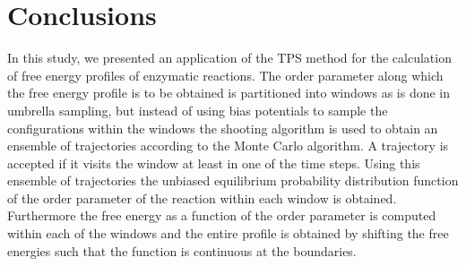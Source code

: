 \documentclass[journal=jpcbfk,manuscript=article,layout=traditional]{achemso}
\begin{document}
\section{Conclusions}
In this study, we presented an application of the TPS method for the calculation 
of free energy profiles of enzymatic reactions. The order parameter along which the 
free energy profile is to be obtained is partitioned into windows as is done in 
umbrella sampling, but instead of using bias potentials to sample the configurations
within the windows the shooting algorithm is used to
obtain an ensemble of trajectories according to the Monte Carlo algorithm. A 
trajectory is accepted if it visits the window at least in one of the time steps. 
Using this ensemble of trajectories the unbiased equilibrium probability distribution 
function of the order parameter of the reaction within each window is obtained.
Furthermore the free energy as a function of the order parameter is computed within 
each of the windows and the entire profile is obtained by shifting the free energies
such that the function is continuous at the boundaries.   
\end{document}
